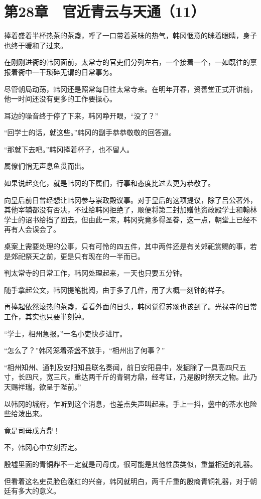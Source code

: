 \section{第28章　官近青云与天通（11）}

捧着盛着半杯热茶的茶盏，呼了一口带着茶味的热气，韩冈惬意的眯着眼睛，身子也终于暖和了过来。

在刚刚进衙的韩冈面前，太常寺的官吏们分列左右，一个接着一个，一如既往的禀报着衙中一干琐碎无谓的日常事务。

尽管朝局动荡，韩冈还是照常每日往太常寺来。在明年开春，资善堂正式开讲前，他一时间还没有更多的工作要操心。

耳边的噪音终于停了下来，韩冈睁开眼，“没了？”

“回学士的话，就这些。”韩冈的副手恭恭敬敬的回答道。

“那就下去吧。”韩冈捧着杯子，也不留人。

属僚们悄无声息鱼贯而出。

如果说起变化，就是韩冈的下属们，行事和态度比过去更为恭敬了。

向皇后前日曾经想让韩冈参与崇政殿议事。对于皇后的这项提议，除了吕公著外，其他宰辅都没有否决，不过给韩冈拒绝了，顺便将第二封加赠他资政殿学士和翰林学士的诏书给挡了回去。但由此一来，韩冈究竟多得圣眷，这一点，朝堂上已经不再有人会误会了。

桌案上需要处理的公事，只有可怜的四五件，其中两件还是有关郊祀赏赐的事，若是郊祀祭天之前，更是只有现在的一半而已。

判太常寺的日常工作，韩冈处理起来，一天也只要五分钟。

随手拿起公文，韩冈提笔批阅，由于多了几件，用了大概一刻钟的样子。

再捧起依然滚热的茶盏，看看外面的日头，韩冈觉得苏颂也该到了。光禄寺的日常工作，其实也只要半刻钟。

“学士，相州急报。”一名小吏快步进厅。

“怎么了？”韩冈笼着茶盏不放手，“相州出了何事？”

“相州知州、通判及安阳知县联名奏闻，前日安阳县中，发掘除了一具高四尺五寸，长四尺，宽三尺，重达两千斤的青铜方鼎，经考证，乃是殷时祭天之物。此乃天赐祥瑞，欲呈于陛前。”

以韩冈的城府，乍听到这个消息，也差点失声叫起来。手上一抖，盏中的茶水也险些给泼出来。

竟是司母戊方鼎！

不，韩冈心中立刻否定。

殷墟里面的青铜鼎不一定就是司母戊，很可能是其他性质类似，重量相近的礼器。

但看着这名吏员脸色涨红的兴奋，韩冈就明白，两千斤重的殷商青铜礼器，对于朝廷有多大的意义。

